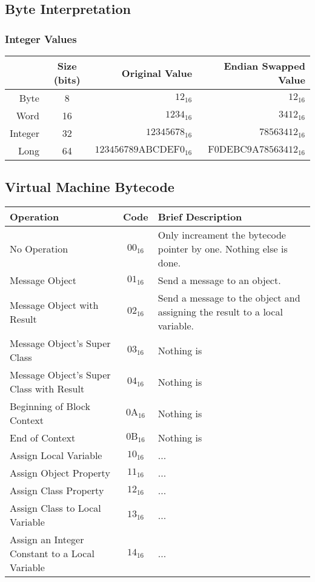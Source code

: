 \subsection {Byte Interpretation}

\subsubsection{Integer Values}

\begin{center}
  \begin{tabular}{ r | c r r }
    & Size (bits) & Original Value & Endian Swapped Value\\ \hline
    Byte & 8 & $12_{16}$ & $12_{16}$ \\
    Word & 16 & $1234_{16}$ & $3412_{16}$ \\
    Integer & 32 & $12345678_{16}$ & $78563412_{16}$ \\
    Long & 64 & $\mathrm{123456789ABCDEF0}_{16}$ &
      $\mathrm{F0DEBC9A78563412}_{16}$\\
  \end{tabular}
\end{center}

\subsection{Virtual Machine Bytecode}

\begin{center}
  \begin{tabular}{ | p{6cm} | c | p{8cm} | }
    \hline
    Operation & Code & Brief Description \\ \hline
    No Operation & $00_{16}$ & Only increament the bytecode pointer by one.
                              Nothing else is done. \\
    Message Object & $01_{16}$ & Send a message to an object. \\
    Message Object with Result & $02_{16}$ & Send a message to the object
                                            and assigning the result to a
                                            local variable. \\
    Message Object's Super Class & $03_{16}$ & Nothing is \\
    Message Object's Super Class with Result & $04_{16}$ & Nothing is \\
    Beginning of Block Context & $\mathrm{0A}_{16}$ & Nothing is \\
    End of Context & $\mathrm{0B}_{16}$ & Nothing is \\
    Assign Local Variable & $10_{16}$ & ...\\
    Assign Object Property & $11_{16}$ & ...\\
    Assign Class Property & $12_{16}$ & ...\\
    Assign Class to Local Variable & $13_{16}$ & ...\\
    Assign an Integer Constant to a Local Variable & $14_{16}$ & ...\\
    \hline
  \end{tabular}
\end{center}

